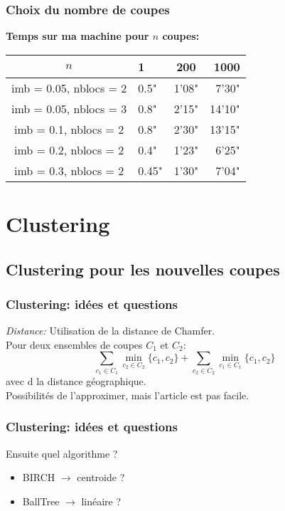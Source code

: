 \documentclass[aspectratio=169]{beamer}
\begin{document}
    \begin{frame}
        \frametitle{Choix du nombre de coupes}
        \textbf{Temps sur ma machine pour $n$ coupes:}\\
        \vspace{5pt}
        \begin{tabular}{|c|l|c|r|} 
            \hline
                $n$ & 1 & 200 & 1000 \\
            \hline
                imb = 0.05, nblocs = 2 &  0.5" & 1'08"& 7'30"\\
            \hline
                imb = 0.05, nblocs = 3 & 0.8" & 2'15" & 14'10"\\
            \hline
                imb = 0.1, nblocs = 2 & 0.8" & 2'30" & 13'15"\\
            \hline
                imb = 0.2, nblocs = 2 & 0.4" & 1'23" & 6'25"\\
            \hline
                imb = 0.3, nblocs = 2 & 0.45" & 1'30" & 7'04"\\
            \hline
            \end{tabular}
    \end{frame}

    \section{Clustering}
    \subsection{Clustering pour les nouvelles coupes}
    \begin{frame}
        \frametitle{Clustering: idées et questions}
        \emph{Distance:}
        Utilisation de la distance de Chamfer.\\
        Pour deux ensembles de coupes $C_1$ et $C_2$:
        $$\sum_{c_1\in C_1}\min_{c_2\in C_2}\{c_1, c_2\} + \sum_{c_2\in C_2}\min_{c_1\in C_1}\{c_1, c_2\}$$
        avec d la distance géographique.\\
        Possibilités de l'approximer, mais l'article est pas facile.
    \end{frame}

    \begin{frame}
        \frametitle{Clustering: idées et questions}
        Ensuite quel algorithme ?\\
        \begin{itemize}
            \item BIRCH $\rightarrow$ centroide ?
            \item BallTree $\rightarrow$ linéaire ?
        \end{itemize}
    \end{frame}

    
\end{document}
